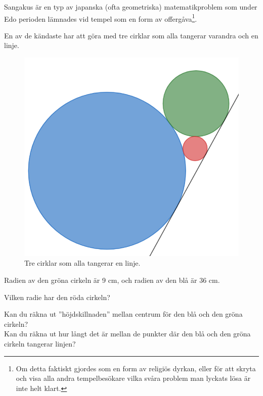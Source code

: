 
Sangakus är en typ av japanska (ofta geometriska) matematikproblem som under Edo perioden lämnades vid tempel som en form av offergåva\footnote{Om detta faktiskt gjordes som en form av religiös dyrkan, eller för att skryta och visa alla andra tempelbesökare vilka svåra problem man lyckats lösa är inte helt klart.}.

En av de kändaste har att göra med tre cirklar som alla tangerar varandra och en linje.
\begin{figure}[H]
    \centering
    \includegraphics[width=0.5\linewidth]{img/tre cirklar.png}
    \caption{Tre cirklar som alla tangerar en linje.}
\end{figure}


Radien av den gröna cirkeln är 9 cm, och radien av den blå är 36 cm.

Vilken radie har den röda cirkeln?

\begin{rem}
    Kan du räkna ut ''höjdskillnaden'' mellan centrum för den blå och den gröna cirkeln?\\
    Kan du räkna ut hur långt det är mellan de punkter där den blå och den gröna cirkeln tangerar linjen?
\end{rem}